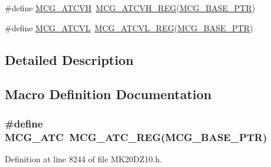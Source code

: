\begin{DoxyCompactItemize}
\item 
\#define \hyperlink{group___m_c_g___register___accessor___macros_ga1cb18ffdb73d4eaad4573563aec49be0}{M\+C\+G\+\_\+\+A\+T\+C\+VH}~\hyperlink{group___m_c_g___register___accessor___macros_gad874adcb4ac61be011c975d1e0441273}{M\+C\+G\+\_\+\+A\+T\+C\+V\+H\+\_\+\+R\+EG}(\hyperlink{group___m_c_g___peripheral_gaceefc72e93a47a35f59a31c57dddf41b}{M\+C\+G\+\_\+\+B\+A\+S\+E\+\_\+\+P\+TR})
\item 
\#define \hyperlink{group___m_c_g___register___accessor___macros_ga4999439546569874f8c31b012637d15f}{M\+C\+G\+\_\+\+A\+T\+C\+VL}~\hyperlink{group___m_c_g___register___accessor___macros_ga474ad360067826ccee78bcec3713b1d2}{M\+C\+G\+\_\+\+A\+T\+C\+V\+L\+\_\+\+R\+EG}(\hyperlink{group___m_c_g___peripheral_gaceefc72e93a47a35f59a31c57dddf41b}{M\+C\+G\+\_\+\+B\+A\+S\+E\+\_\+\+P\+TR})
\end{DoxyCompactItemize}


\subsection{Detailed Description}


\subsection{Macro Definition Documentation}
\subsubsection[{\texorpdfstring{M\+C\+G\+\_\+\+A\+TC}{MCG_ATC}}]{\setlength{\rightskip}{0pt plus 5cm}\#define M\+C\+G\+\_\+\+A\+TC~{\bf M\+C\+G\+\_\+\+A\+T\+C\+\_\+\+R\+EG}({\bf M\+C\+G\+\_\+\+B\+A\+S\+E\+\_\+\+P\+TR})}\hypertarget{group___m_c_g___register___accessor___macros_gabd0a7b1bb379aff17b67d3b397089509}{}\label{group___m_c_g___register___accessor___macros_gabd0a7b1bb379aff17b67d3b397089509}


Definition at line 8244 of file M\+K20\+D\+Z10.\+h.

